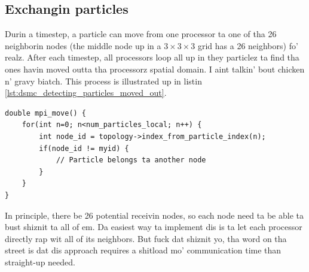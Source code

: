 \subsection{Exchangin particles}
\label{sec:dsmc_parallelization_exchange_particles}
Durin a timestep, a particle can move from one processor ta one of tha 26 neighborin nodes (the middle node up in a $3\times3\times3$ grid has a 26 neighbors) fo' realz. After each timestep, all processors loop all up in they particlez ta find tha ones havin moved outta tha processorz spatial domain. I aint talkin' bout chicken n' gravy biatch. This process is illustrated up in listin \ref{lst:dsmc_detecting_particles_moved_out}.
\begin{lstlisting}[caption=Detectin which particlez moved outta a processorz spatial domain., label=lst:dsmc_detecting_particles_moved_out]
double mpi_move() {
	for(int n=0; n<num_particles_local; n++) {
		int node_id = topology->index_from_particle_index(n);
		if(node_id != myid) {
			// Particle belongs ta another node
		}
	}
}
\end{lstlisting}
In principle, there be 26 potential receivin nodes, so each node need ta be able ta bust shiznit ta all of em. Da easiest way ta implement dis is ta let each processor directly rap wit all of its neighbors. But fuck dat shiznit yo, tha word on tha street is dat dis approach requires a shitload mo' communication time than straight-up needed.

